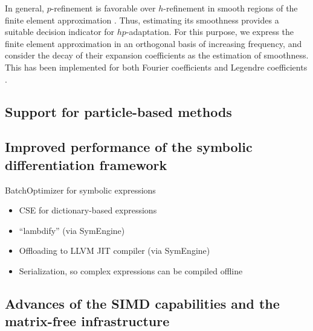 \documentclass{ansarticle-preprint}
\begin{document}
In general, $p$-refinement is favorable over $h$-refinement in smooth regions of
the finite element approximation \cite[Thm.~3.4]{BabuskaSuri1990}. Thus, estimating
its smoothness provides a suitable decision indicator for $hp$-adaptation. For this
purpose, we express the finite element approximation in an orthogonal
basis of increasing frequency, and consider the decay of their expansion
coefficients as the estimation of smoothness. This has been implemented for both
Fourier coefficients \cite{BangerthKayserHerold2007} and Legendre coefficients
\cite{Mavriplis1994,HoustonSeniorSueli2003,HoustonSueli2005,EibnerMelenk2007}.


\subsection{Support for particle-based methods}
\label{subsec:particles}



\subsection{Improved performance of the symbolic differentiation framework}
\label{subsec:symbdiff}


BatchOptimizer for symbolic expressions
\begin{itemize}
\item CSE for dictionary-based expressions
\item ``lambdify'' (via SymEngine)
\item Offloading to LLVM JIT compiler (via SymEngine)
\item Serialization, so complex expressions can be compiled offline
\end{itemize}


\subsection{Advances of the SIMD capabilities and the matrix-free infrastructure}
\label{subsec:mf}

\end{document}
